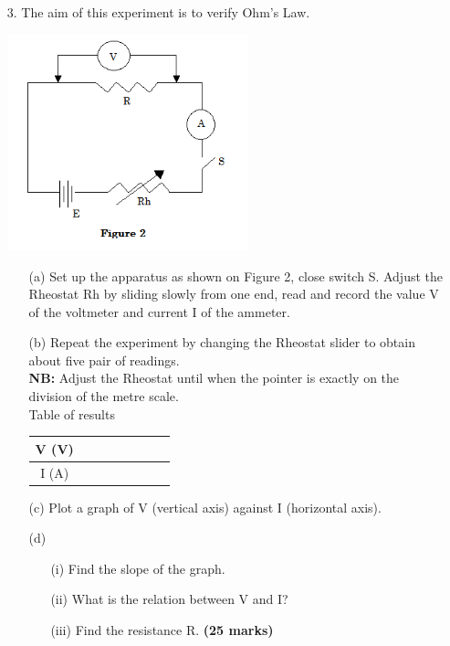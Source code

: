 \begin{enumerate}
\item[3.] The aim of this experiment is to verify Ohm's Law.

\begin{center}
\includegraphics[width=7cm]{./img/2009-3-alt.png}
\end{center}

\begin{itemize}
\item[(a)] Set up the apparatus as shown on Figure 2, close switch S. Adjust the Rheostat Rh by sliding slowly from one end, read and record the value V of the voltmeter and current I of the ammeter.
\item[(b)] Repeat the experiment by changing the Rheostat slider to obtain about five pair of readings.\\[10pt]

\textbf{NB:} Adjust the Rheostat until when the pointer is exactly on the division of the metre scale.\\[10pt]

Table of results\\[10pt]
\begin{tabular}{|c|c|c|c|c|c|c|c|}\hline
V (V)&&&&&&&\\ \hline
I (A)&&&&&&& \\ \hline
\end{tabular}

\item[(c)] Plot a graph of V (vertical axis) against I (horizontal axis).
\item[(d)] 
\begin{itemize}
\item[(i)] Find the slope of the graph.
\item[(ii)] What is the relation between V and I?
\item[(iii)] Find the resistance R. \hfill \textbf{(25 marks)}
\end{itemize}
\end{itemize}

\end{enumerate}
\flushleft
